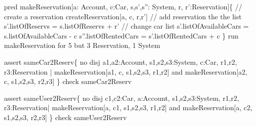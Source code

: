 \documentclass[a4paper]{article}
\begin{document}
pred makeReservation[a: Account, c:Car, s,s',s'': System, r, r':Reservation]\{ \newline
\hspace*{5 mm}		// create a reservation \newline
\hspace*{5 mm}		createReservation[a, c, r,r']  \newline
\hspace*{5 mm}		// add reservation the the list \newline	
\hspace*{5 mm}		s'.listOfReservs = s.listOfReservs + r' \newline
\hspace*{5 mm}		// change car list  \newline
\hspace*{5 mm}		s'.listOfAvailableCars = s.listOfAvailableCars - c \newline
\hspace*{5 mm}		s''.listOfRentedCars = s'.listOfRentedCars + c \newline
\} \newline
run makeReservation for 5 but 3 Reservation, 1 System  \newline

assert sameCar2Reserv\{ \newline
\hspace*{5 mm}		no disj a1,a2:Account, s1,s2,s3:System, c:Car, r1,r2, r3:Reservation | \newline
\hspace*{5 mm}			makeReservation[a1, c, s1,s2,s3, r1,r2] and makeReservation[a2, c, s1,s2,s3, r2,r3] \newline
\} \newline
check sameCar2Reserv \newline

assert sameUser2Reserv\{ \newline
\hspace*{5 mm}		no disj c1,c2:Car, a:Account, s1,s2,s3:System, r1,r2, r3:Reservation| \newline
\hspace*{5 mm}			makeReservation[a, c1, s1,s2,s3, r1,r2] and makeReservation[a, c2, \hspace*{5 mm}	s1,s2,s3, r2,r3] \newline
\} \newline
check sameUser2Reserv \newline
\rmfamily
\end{document}
